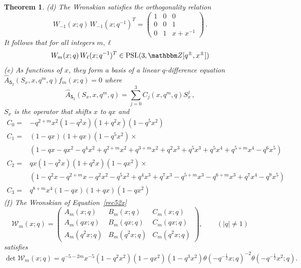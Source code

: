 \documentclass[12pt,reqno]{amsart}
\newtheorem{theorem}{Theorem}
\theoremstyle{definition}
\def\BZ{\mathbbm Z}
\def\calW{\mathcal W}
\def\SL{\mathrm{SL}}
\def\PSL{\mathrm{PSL}}
\def\th{\theta}
\def\md{\mathbf}
\newcommand{\knot}[1]{\md{#1}}
\newcommand{\nn}{\nonumber \\}
\begin{document}
\begin{theorem}
  \rm{(d)} The Wronskian satisfies the orthogonality relation
  \begin{equation}
    \label{WW52b}
    W_{-1}(x;q) \, W_{-1}(x;q^{-1})^T =
    \begin{pmatrix}
      1 & 0 & 0\\
      0 & 0 & 1\\
      0 & 1 & x+x^{-1}
    \end{pmatrix} \,.
  \end{equation}
  It follows that for all integers $m,\ell$ 
  \begin{equation}
    \label{WW52}
    W_m(x;q) \,  W_\ell(x;q^{-1})^T \in
    \PSL(3,\BZ[q^\pm, x^\pm])
  \end{equation}
  \rm{(e)} As functions of $x$, they form a basis of a linear
  $q$-difference equation
  $\hat A_{\knot{5}_2}(S_x,x,q^m,q) f_m(x;q) =0$
where 
  \begin{equation}
    \label{rec52x}
    \hat A_{\knot{5}_2} (S_x,x,q^m,q) = \sum_{j=0}^3 C_j(x,q^m,q) S_x^j \,,
  \end{equation}
  $S_x$ is the operator that shifts $x$ to $qx$ and
  {\tiny
    \begin{subequations}
      \begin{align}        
        C_0 =
        & -q^{2 + m} x^2 (1 - q^2 x) (1 + q^2 x) (1 - q^5 x^2)
          \label{rec52x0}\\
        C_1 =
        &(1 - q x) (1 + q x) (1 - q^5 x^2) \times
        \nn
        & (1 - q x - q x^2 - q^4 x^2 + q^{2 + m} x^2 + q^{3 + m} x^2 +
          q^2 x^3
          + q^5 x^3 + q^5 x^4 + q^{5 + m} x^4 - q^6 x^5)
          \label{rec52x1}\\
        C_2 =
        & qx(1-q^2x)(1+q^2x)(1-qx^2)\times \nn
        &(1-q^2x-q^{2+m}x-q^2x^2-q^5x^2+q^4x^3+q^7x^3
          -q^{5+m}x^3-q^{6+m}x^3+q^7x^4-q^9x^5)
          \label{rec52x2}\\
        C_3 =
        & q^{8+m} x^4 (1 - q x) (1 + q x) (1 - q x^2)
          \label{rec52x3}
      \end{align}
    \end{subequations}
  }
  \rm{(f)} The Wronskian of Equation~\eqref{rec52x}
  \begin{equation}
    \label{W52x}
    \calW_m(x;q) = \begin{pmatrix}
      A_{m}(x;q) & B_{m}(x;q) & C_{m}(x;q) \\
      A_{m}(qx;q) & B_{m}(qx;q) & C_{m}(qx;q) \\
      A_{m}(q^2x;q) & B_{m}(q^2x;q) & C_{m}(q^2x;q) 
    \end{pmatrix}, \qquad (|q| \neq 1)
  \end{equation}
  satisfies 
  \begin{equation}
    \det \calW_m(x;q) = q^{-5-2m}x^{-5}%
    (1-q^2x^2)(1-qx^2)(1-q^3x^2)
    \th(-q^{-\frac{1}{2}}x;q)^{-2}\th(-q^{-\frac{1}{2}}x^2;q).
    \label{detW52x}
  \end{equation}
\end{theorem}
\end{document}
